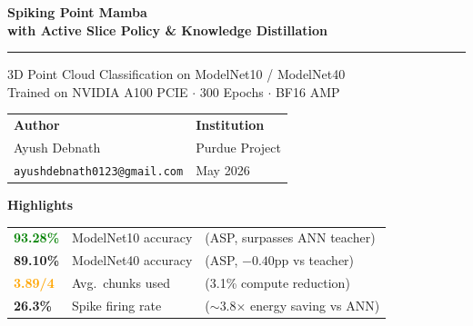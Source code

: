 \documentclass[11pt,a4paper]{article}
\begin{document}

\begin{titlepage}
\centering
\vspace*{3cm}

\vspace{-2.6cm}

{\Huge\bfseries\color{accent} Spiking Point Mamba}\\[6pt]
{\Large\bfseries\color{darktext} with Active Slice Policy \& Knowledge Distillation}

\vspace{1.5cm}
\textcolor{rulecol}{\rule{10cm}{1.2pt}}
\vspace{0.8cm}

{\large 3D Point Cloud Classification on ModelNet10 / ModelNet40}\\[4pt]
{\normalsize Trained on NVIDIA A100 PCIE $\cdot$ 300 Epochs $\cdot$ BF16 AMP}

\vspace{2.5cm}

\begin{tabular}{C{5cm}C{5cm}}
\textbf{Author} & \textbf{Institution}\\
\textcolor{accent}{Ayush Debnath} & Purdue Project\\
\texttt{ayushdebnath0123@gmail.com} & May 2026
\end{tabular}

\vspace{2.5cm}

\begin{keybox}
\centering
\textbf{Highlights}\\[6pt]
\begin{tabular}{lll}
\textcolor{green}{\textbf{93.28\%}} & ModelNet10 accuracy & (ASP, surpasses ANN teacher) \\
\textcolor{accent}{\textbf{89.10\%}} & ModelNet40 accuracy & (ASP, $-0.40$pp vs teacher) \\
\textcolor{orange}{\textbf{3.89/4}} & Avg.\ chunks used & (3.1\% compute reduction) \\
\textcolor{accent}{\textbf{26.3\%}} & Spike firing rate & ($\sim$3.8$\times$ energy saving vs ANN) \\
\end{tabular}
\end{keybox}

\end{titlepage}
\end{document}
